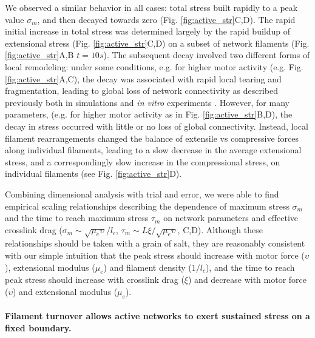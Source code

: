 We observed a similar behavior in all cases: total stress built rapidly to a peak value $\sigma_m$, and then decayed towards zero (Fig. \ref{fig:active_str}C,D).  The rapid initial increase in total stress was determined largely by the rapid buildup of extensional stress (Fig. \ref{fig:active_str}C,D) on a subset of network filaments (Fig. \ref{fig:active_str}A,B $t=10s$). The subsequent decay involved two different forms of local remodeling: under some conditions, e.g. for higher motor activity (e.g. Fig. \ref{fig:active_str}A,C), the decay was associated with rapid local tearing and fragmentation, leading to global loss of network connectivity as described previously both in simulations\cite{Mak:2016aa} and {\em in vitro}  experiments \cite{Alvarado:2013aa}.  However, for many parameters, (e.g. for higher motor activity  as in Fig. \ref{fig:active_str}B,D), the decay in stress occurred with little or no loss of global connectivity.  Instead, local filament rearrangements changed the balance of extensile vs compressive forces along individual filaments, leading to a slow decrease in the average extensional stress, and a correspondingly slow increase in the compressional stress, on individual filaments (see Fig. \ref{fig:active_str}D).  

Combining dimensional analysis with trial and error, we were able to find empirical scaling relationships describing the dependence of maximum stress $\sigma_m$ and the time to reach maximum stress $\tau_m$ on network parameters and effective crosslink drag  ($\sigma_m \sim \sqrt{\mu_e\upsilon}/l_c$, $\tau_m\sim L\xi/\sqrt{\mu_e\upsilon}$, C,D). Although these relationships should be taken with a grain of salt, they are reasonably consistent with our simple intuition that the peak stress should increase with motor force ($\upsilon$), extensional modulus ($\mu_e$) and filament density ($1/l_c$), and the time to reach peak stress should increase with crosslink drag ($\xi$) and decrease with motor force ($\upsilon$) and extensional modulus ($\mu_e$).  

\paragraph{Filament turnover allows active networks to exert sustained stress on a fixed boundary.}

